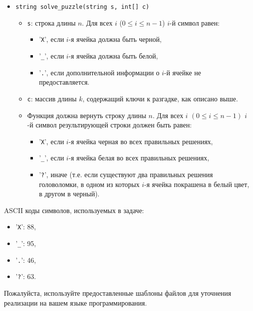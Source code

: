 \begin{itemize}

\item \texttt{string solve\_puzzle(string s, int[] c)}

\begin{itemize}
\item \texttt{s}: строка длины $n$. Для всех $i$ ($0 \leq i \leq n - 1$) $i$-й символ равен:
\begin{itemize}
\item '\texttt{X}', если $i$-я ячейка должна быть черной, 
\item '\texttt{\_}', если $i$-я ячейка должна быть белой,
\item '\texttt{.}', если дополнительной информации о $i$-й ячейке не предоставляется.
\end{itemize}
\item \texttt{c}: массив длины $k$, содержащий ключи к разгадке, как описано выше.
\item Функция должна вернуть строку длины $n$. Для всех $i$ $(0 \le i \le n - 1)$ $i$-й символ результирующей строки должен быть равен:
\begin{itemize}
\item '\texttt{X}', если $i$-я ячейка черная во всех правильных решениях,
\item '\texttt{\_}', если $i$-я ячейка белая во всех правильных решениях,
\item '\texttt{?}', иначе (т.е. если существуют два правильных решения головоломки, в одном из которых $i$-я ячейка покрашена в белый цвет, в другом в черный).
\end{itemize}
\end{itemize}
\end{itemize}

ASCII коды символов, используемых в задаче: 
\begin{itemize}
\item '\texttt{X}': 88,
\item '\texttt{\_}': 95, 
\item '\texttt{.}': 46,
\item '\texttt{?}': 63.
\end{itemize}

Пожалуйста, используйте предоставленные шаблоны файлов для уточнения реализации на вашем языке программирования.
